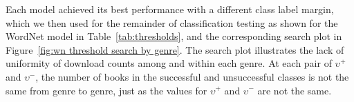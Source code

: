 Each model achieved its best performance with a different class label margin, which we then used for the remainder of classification testing as shown for the WordNet model in Table~\ref{tab:thresholds}, and the corresponding search plot in Figure~\ref{fig:wn threshold search by genre}.
The search plot illustrates the lack of uniformity of download counts among and within each genre.
At each pair of $\upsilon^+$ and $\upsilon^-$, the number of books in the successful and unsuccessful classes is not the same from genre to genre, just as the values for $\upsilon^+$ and $\upsilon^-$ are not the same.
